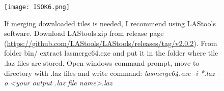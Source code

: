 \begin{figure}[H]
	\centering
	\texttt{[image: ISOK6.png]}
	\caption{If merging downloaded tiles is needed, I recommend using LAStools software. Download LAStools.zip from release page (\url{https://github.com/LAStools/LAStools/releases/tag/v2.0.2}). From folder bin/ extract lasmerge64.exe and put it in the folder where tile .laz files are stored. Open windows command prompt, move to directory with .laz files and write command: 
	\textit{lasmerge64.exe -i *.laz -o <your output .laz file name>.laz}}
	\label{fig:39}
\end{figure}
